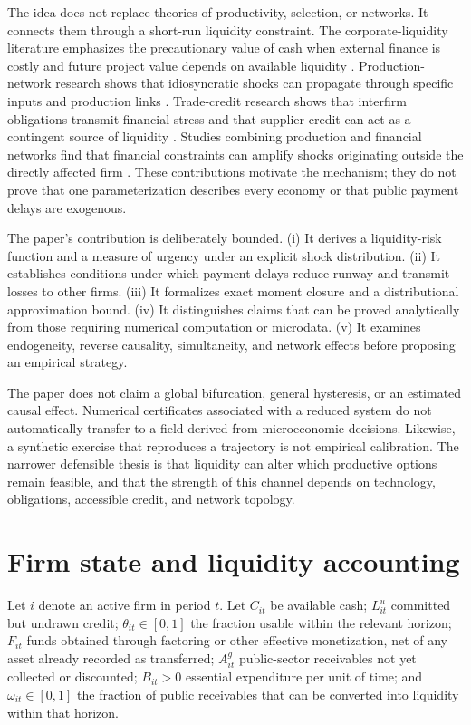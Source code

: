 \documentclass[11pt,a4paper]{article}
\begin{document}
The idea does not replace theories of productivity, selection, or networks. It connects them through a short-run liquidity constraint. The corporate-liquidity literature emphasizes the precautionary value of cash when external finance is costly and future project value depends on available liquidity \citep{almeida2014,almeida2007,fazzari1988}. Production-network research shows that idiosyncratic shocks can propagate through specific inputs and production links \citep{acemoglu2012,carvalho2014,barrot2016}. Trade-credit research shows that interfirm obligations transmit financial stress and that supplier credit can act as a contingent source of liquidity \citep{boissay2013,jacobson2015,amberg2021,costello2020}. Studies combining production and financial networks find that financial constraints can amplify shocks originating outside the directly affected firm \citep{demir2024,huremovic2026}. These contributions motivate the mechanism; they do not prove that one parameterization describes every economy or that public payment delays are exogenous.

The paper’s contribution is deliberately bounded. (i) It derives a liquidity-risk function and a measure of urgency under an explicit shock distribution. (ii) It establishes conditions under which payment delays reduce runway and transmit losses to other firms. (iii) It formalizes exact moment closure and a distributional approximation bound. (iv) It distinguishes claims that can be proved analytically from those requiring numerical computation or microdata. (v) It examines endogeneity, reverse causality, simultaneity, and network effects before proposing an empirical strategy.

The paper does not claim a global bifurcation, general hysteresis, or an estimated causal effect. Numerical certificates associated with a reduced system do not automatically transfer to a field derived from microeconomic decisions. Likewise, a synthetic exercise that reproduces a trajectory is not empirical calibration. The narrower defensible thesis is that liquidity can alter which productive options remain feasible, and that the strength of this channel depends on technology, obligations, accessible credit, and network topology.

\section{Firm state and liquidity accounting}
Let $i$ denote an active firm in period $t$. Let $C_{it}$ be available cash; $L^u_{it}$ committed but undrawn credit; $\theta_{it}\in[0,1]$ the fraction usable within the relevant horizon; $F_{it}$ funds obtained through factoring or other effective monetization, net of any asset already recorded as transferred; $A^g_{it}$ public-sector receivables not yet collected or discounted; $B_{it}>0$ essential expenditure per unit of time; and $\omega_{it}\in[0,1]$ the fraction of public receivables that can be converted into liquidity within that horizon.
\end{document}

